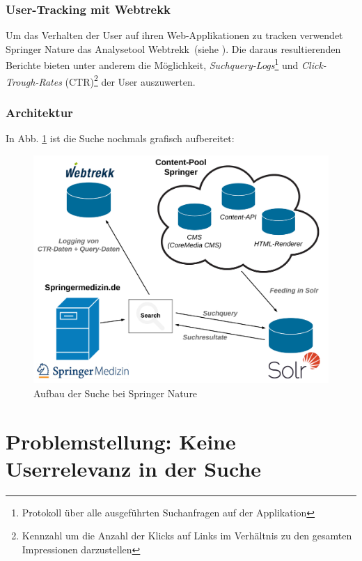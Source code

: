 \subsubsection{User-Tracking mit Webtrekk}
\label{sec:Einfuehrung:AufbauSucheBeiSpringerNature:Webtrekk}

Um das Verhalten der User auf ihren Web-Applikationen zu tracken verwendet Springer Nature das Analysetool Webtrekk~(siehe \cite{webtrekk}). Die daraus resultierenden Berichte bieten unter anderem die Möglichkeit, \textit{Suchquery-Logs}\footnote{Protokoll über alle ausgeführten Suchanfragen auf der Applikation} und \textit{Click-Trough-Rates} (CTR)\footnote{Kennzahl um die Anzahl der Klicks auf Links im Verhältnis zu den gesamten Impressionen darzustellen} der User auszuwerten.

\pagebreak

\subsubsection{Architektur}
\label{sec:Einfuehrung:AufbauSucheBeiSpringerNature:Architektur}

In Abb. \ref{fig:SucheSpringerNature} ist die Suche nochmals grafisch aufbereitet:

\begin{figure}[H]
\centering
\includegraphics[width=0.5\linewidth]{gfx/AufbauSucheSpringerNature}
\caption[Aufbau der Suche bei Springer Nature]{Aufbau der Suche bei Springer Nature}
\label{fig:SucheSpringerNature}
\end{figure}


\section{Problemstellung: Keine Userrelevanz in der Suche}
\label{sec:Einfuehrung:Problemstellung}

